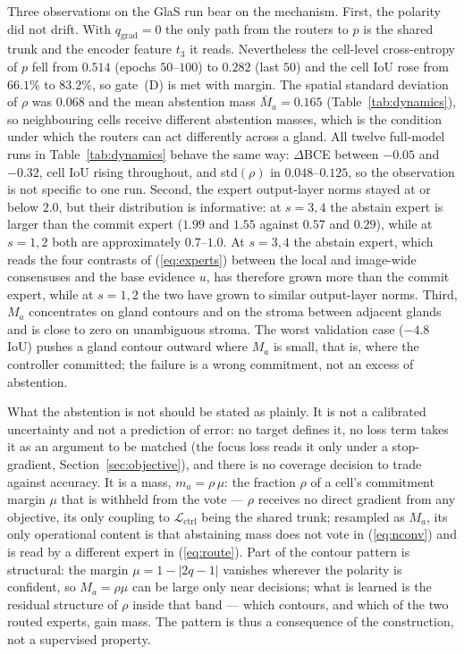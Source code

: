 Three observations on the GlaS run bear on the mechanism. First, the polarity did not drift. With $q_{\mathrm{grad}}=0$ the only path from the routers to $p$ is the shared trunk and the encoder feature $t_3$ it reads. Nevertheless the cell-level cross-entropy of $p$ fell from $0.514$ (epochs $50$--$100$) to $0.282$ (last $50$) and the cell IoU rose from $66.1\%$ to $83.2\%$, so gate~(D) is met with margin. The spatial standard deviation of $\rho$ was $0.068$ and the mean abstention mass $\bar M_a=0.165$ (Table~\ref{tab:dynamics}), so neighbouring cells receive different abstention masses, which is the condition under which the routers can act differently across a gland. All twelve full-model runs in Table~\ref{tab:dynamics} behave the same way: $\Delta$BCE between $-0.05$ and $-0.32$, cell IoU rising throughout, and std$(\rho)$ in $0.048$--$0.125$, so the observation is not specific to one run. Second, the expert output-layer norms stayed at or below $2.0$, but their distribution is informative: at $s=3,4$ the abstain expert is larger than the commit expert ($1.99$ and $1.55$ against $0.57$ and $0.29$), while at $s=1,2$ both are approximately $0.7$--$1.0$. At $s=3,4$ the abstain expert, which reads the four contrasts of (\ref{eq:experts}) between the local and image-wide consensuses and the base evidence $u$, has therefore grown more than the commit expert, while at $s=1,2$ the two have grown to similar output-layer norms. Third, $M_a$ concentrates on gland contours and on the stroma between adjacent glands and is close to zero on unambiguous stroma. The worst validation case ($-4.8$ IoU) pushes a gland contour outward where $M_a$ is small, that is, where the controller committed; the failure is a wrong commitment, not an excess of abstention.

What the abstention is not should be stated as plainly. It is not a calibrated uncertainty and not a prediction of error: no target defines it, no loss term takes it as an argument to be matched (the focus loss reads it only under a stop-gradient, Section~\ref{sec:objective}), and there is no coverage decision to trade against accuracy. It is a mass, $m_a=\rho\,\mu$: the fraction $\rho$ of a cell's commitment margin $\mu$ that is withheld from the vote --- $\rho$ receives no direct gradient from any objective, its only coupling to $\mathcal{L}_{\mathrm{ctrl}}$ being the shared trunk; resampled as $M_a$, its only operational content is that abstaining mass does not vote in (\ref{eq:nconv}) and is read by a different expert in (\ref{eq:route}). Part of the contour pattern is structural: the margin $\mu=1-|2q-1|$ vanishes wherever the polarity is confident, so $M_a=\rho\mu$ can be large only near decisions; what is learned is the residual structure of $\rho$ inside that band --- which contours, and which of the two routed experts, gain mass. The pattern is thus a consequence of the construction, not a supervised property.

